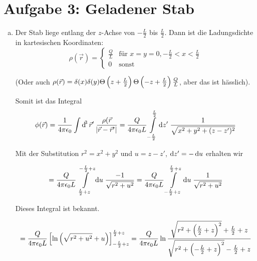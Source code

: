 \documentclass[a4paper,german,12pt,smallheadings]{scrartcl}
\begin{document}
\section*{Aufgabe 3: Geladener Stab}
\begin{enumerate}[a)]
  \item
    Der Stab liege entlang der $z$-Achse von $-\frac{L}{2}$ bis $\frac{L}{2}$.
    Dann ist die Ladungsdichte in kartesischen Koordinaten:
    \begin{equation}
      \rho(\vec{r}) = \begin{cases}
        \frac{Q}{L} &\mbox{für } x = y = 0, -\frac{L}{2} < x < \frac{L}{2} \\
        0           &\mbox{sonst}
      \end{cases}
    \end{equation}

    (Oder auch $\rho(\vec{r}) = \delta(x) \delta(y) \Theta\del{z + \frac{L}{2}}
    \Theta\del{-z + \frac{L}{2}} \frac{Q}{L}$, aber das ist hässlich).

    Somit ist das Integral
    \begin{equation}
      \phi(\vec{r}) = \frac{1}{4 \pi \epsilon_0} \int \dif^3\vec{r}' \; \frac{\rho(\vec{r}}{\envert{\vec{r} - \vec{r}'}}
      =
      \frac{Q}{4 \pi \epsilon_0 L} \int\limits_{-\frac{L}{2}}^{\frac{L}{2}} \dif z' \; \frac{1}{\sqrt{x^2 + y^2 + (z - z')^2}}
    \end{equation}

    Mit der Substitution $r^2 = x^2 + y^2$ und $u = z - z'$, $\dif z' = - \dif u$ erhalten wir

    \begin{equation}
      = \frac{Q}{4 \pi \epsilon_0 L} \int\limits_{\frac{L}{2}+z}^{-\frac{L}{2}+z} \dif u \; \frac{-1}{\sqrt{r^2 + u^2}}
      = \frac{Q}{4 \pi \epsilon_0 L} \int\limits_{-\frac{L}{2}+z}^{\frac{L}{2}+z} \dif u \; \frac{1}{\sqrt{r^2 + u^2}}
    \end{equation}

    Dieses Integral ist bekannt.

    \begin{equation}
      = \frac{Q}{4 \pi \epsilon_0 L} \sbr[2]{\ln\del{ \sqrt{r^2 + u^2} + u}}_{-\frac{L}{2} + z}^{\frac{L}{2} + z}
      = \frac{Q}{4 \pi \epsilon_0 L} \ln \frac{
        \sqrt{r^2 + \del{\frac{L}{2} + z}^2} + \frac{L}{2} + z
      }{
        \sqrt{r^2 + \del{-\frac{L}{2} + z}^2} - \frac{L}{2} + z
      }
    \end{equation}


\end{enumerate}
\end{document}
